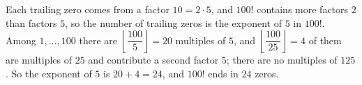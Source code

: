 Each trailing zero comes from a factor $10=2\cdot5$, and $100!$ contains more factors $2$ than factors $5$, so the number of trailing zeros is the exponent of $5$ in $100!$. Among $1,\dots,100$ there are $\left\lfloor\dfrac{100}{5}\right\rfloor=20$ multiples of $5$, and $\left\lfloor\dfrac{100}{25}\right\rfloor=4$ of them are multiples of $25$ and contribute a second factor $5$; there are no multiples of $125$. So the exponent of $5$ is $20+4=24$, and $100!$ ends in $\boxed{24}$ zeros.
